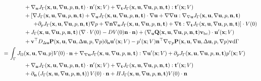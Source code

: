 \documentclass[oneside]{book}
\numberwithin{equation}{section}
\begin{document}
\begin{equation*}
{\begin{split}
        &\hspace{1cm}+ \nabla_{\bf n}J_\Gamma({\bf x},{\bf u},\nabla{\bf u},p,{\bf n},{\bf t})\cdot{\bf n}'({\bf x};V) + \nabla_{\bf t}J_\Gamma({\bf x},{\bf u},\nabla{\bf u},p,{\bf n},{\bf t}):{\bf t}'({\bf x};V)\\
        &\hspace{1cm}+ \left[\nabla J_\Gamma({\bf x},{\bf u},\nabla{\bf u},p,{\bf n},{\bf t}) + \nabla_{\bf u}J_\Gamma({\bf x},{\bf u},\nabla{\bf u},p,{\bf n},{\bf t})\cdot\nabla{\bf u} + \nabla\nabla{\bf u}:\nabla_{\nabla{\bf u}}J_\Gamma({\bf x},{\bf u},\nabla{\bf u},p,{\bf n},{\bf t})\right.\\
        &\hspace{15mm} \left.+ \partial_pJ_\Gamma({\bf x},{\bf u},\nabla{\bf u},p,{\bf n},{\bf t})\nabla p + \nabla{\bf n}\nabla_{\bf n}J_\Gamma({\bf x},{\bf u},\nabla{\bf u},p,{\bf n},{\bf t}) + \nabla{\bf t}:\nabla_{\bf t}J_\Gamma({\bf x},{\bf u},\nabla{\bf u},p,{\bf n},{\bf t})\right]\cdot V(0)\\
        &\hspace{1cm}+ J_\Gamma({\bf x},{\bf u},\nabla{\bf u},p,{\bf n},{\bf t})\left(\nabla\cdot V(0) - DV(0){\bf n}\cdot{\bf n}\right) + \left(\nabla_{\bf u}{\bf Q}({\bf x},{\bf u},\nabla{\bf u},p,{\bf n},{\bf t}){\bf v}_{\rm bc}\right)\cdot{\bf u}'({\bf x};V)\\
        &\hspace{1cm}+ {\bf v}^\top D_{\Delta{\bf u}}{\bf P}({\bf x},{\bf u},\nabla{\bf u},\Delta{\bf u},p,\nabla p)\partial_{\bf n}{\bf u}'({\bf x};V) - p'({\bf x};V){\bf n}^\top\nabla_{\nabla p}{\bf P}({\bf x},{\bf u},\nabla{\bf u},\Delta{\bf u},p,\nabla p){\bf v}{\rm d}\Gamma\\
        =&\, \int_\Gamma J_\Omega({\bf x},{\bf u},\nabla{\bf u},p)V(0)\cdot{\bf n} + \nabla_{\nabla{\bf u}}J_\Gamma({\bf x},{\bf u},\nabla{\bf u},p,{\bf n},{\bf t}):\nabla{\bf u}'({\bf x};V) + \partial_pJ_\Gamma({\bf x},{\bf u},\nabla{\bf u},p,{\bf n},{\bf t})p'({\bf x};V)\\
        &\hspace{1cm}+ \nabla_{\bf n}J_\Gamma({\bf x},{\bf u},\nabla{\bf u},p,{\bf n},{\bf t})\cdot{\bf n}'({\bf x};V) + \nabla_{\bf t}J_\Gamma({\bf x},{\bf u},\nabla{\bf u},p,{\bf n},{\bf t}):{\bf t}'({\bf x};V)\\
        &\hspace{1cm}+ \partial_{\bf n}\left(J_\Gamma({\bf x},{\bf u},\nabla{\bf u},p,{\bf n},{\bf t})\right)V(0)\cdot{\bf n} + HJ_\Gamma({\bf x},{\bf u},\nabla{\bf u},p,{\bf n},{\bf t})V(0)\cdot{\bf n}\\

\end{split}}
\end{equation*}
\end{document}
